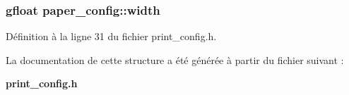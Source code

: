 \subsubsection[{width}]{\setlength{\rightskip}{0pt plus 5cm}gfloat {\bf paper\_\-config::width}}\label{structpaper__config_a7b21169b98e234c5104050e58a2fe8ba}


Définition à la ligne 31 du fichier print\_\-config.h.



La documentation de cette structure a été générée à partir du fichier suivant :\begin{DoxyCompactItemize}
\item 
{\bf print\_\-config.h}\end{DoxyCompactItemize}
